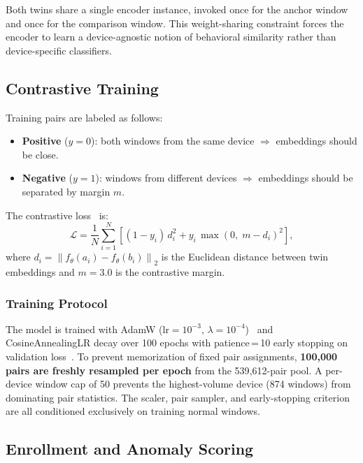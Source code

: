 \documentclass[journal,10pt,twoside]{IEEEtran}
\newcommand{\norm}[1]{\left\lVert #1 \right\rVert}
\begin{document}
Both twins share a single encoder instance, invoked once for the anchor window
and once for the comparison window.
This weight-sharing constraint forces the encoder to learn a device-agnostic
notion of behavioral similarity rather than device-specific classifiers.

\subsection{Contrastive Training}

Training pairs are labeled as follows:
\begin{itemize}
  \item \textbf{Positive} ($y=0$): both windows from the same device
    $\Rightarrow$ embeddings should be close.
  \item \textbf{Negative} ($y=1$): windows from different devices
    $\Rightarrow$ embeddings should be separated by margin $m$.
\end{itemize}

The contrastive loss~\cite{hadsell2006contrastive} is:
\begin{equation}
  \mathcal{L} = \frac{1}{N}\sum_{i=1}^{N}
    \left[(1-y_i)\,d_i^2
    + y_i\,\max\!\left(0,\; m - d_i\right)^2\right],
  \label{eq:loss}
\end{equation}
where $d_i = \norm{f_\theta(a_i) - f_\theta(b_i)}_2$ is the Euclidean
distance between twin embeddings and $m=3.0$ is the contrastive margin.

\subsubsection*{Training Protocol}
The model is trained with AdamW
($\text{lr}=10^{-3}$, $\lambda=10^{-4}$)~\cite{loshchilov2019adamw}
and CosineAnnealingLR decay over 100 epochs with patience\,=\,10 early
stopping on validation loss~\cite{pytorch2019}.
To prevent memorization of fixed pair assignments, \textbf{100{,}000 pairs are
freshly resampled per epoch} from the 539{,}612-pair pool.
A per-device window cap of 50 prevents the highest-volume device (874 windows)
from dominating pair statistics.
The scaler, pair sampler, and early-stopping criterion are all conditioned
exclusively on training normal windows.

\subsection{Enrollment and Anomaly Scoring}
\end{document}
